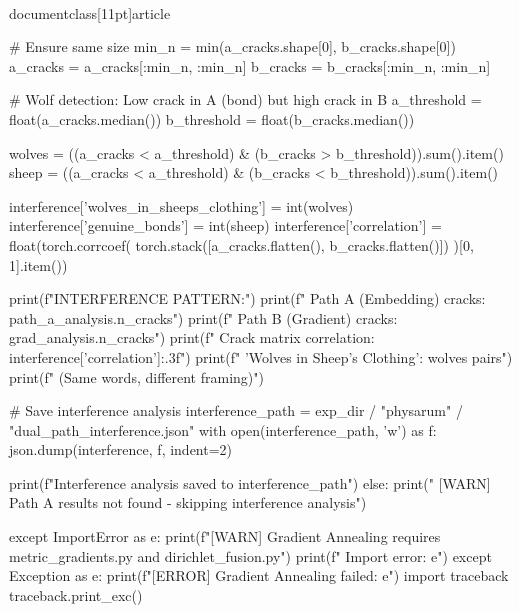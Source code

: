 \\documentclass[11pt]{article}
\begin{document}
\begin{CodeBlock}
                        # Ensure same size
                        min_n = min(a_cracks.shape[0], b_cracks.shape[0])
                        a_cracks = a_cracks[:min_n, :min_n]
                        b_cracks = b_cracks[:min_n, :min_n]
                        
                        # Wolf detection: Low crack in A (bond) but high crack in B
                        a_threshold = float(a_cracks.median())
                        b_threshold = float(b_cracks.median())
                        
                        wolves = ((a_cracks < a_threshold) & (b_cracks > b_threshold)).sum().item()
                        sheep = ((a_cracks < a_threshold) & (b_cracks < b_threshold)).sum().item()
                        
                        interference['wolves_in_sheeps_clothing'] = int(wolves)
                        interference['genuine_bonds'] = int(sheep)
                        interference['correlation'] = float(torch.corrcoef(
                            torch.stack([a_cracks.flatten(), b_cracks.flatten()])
                        )[0, 1].item())
                        
                        print(f"\n  INTERFERENCE PATTERN:")
                        print(f"    Path A (Embedding) cracks: {path_a_analysis.n_cracks}")
                        print(f"    Path B (Gradient) cracks: {grad_analysis.n_cracks}")
                        print(f"    Crack matrix correlation: {interference['correlation']:.3f}")
                        print(f"    'Wolves in Sheep's Clothing': {wolves} pairs")
                        print(f"    (Same words, different framing)")
                    
                    # Save interference analysis
                    interference_path = exp_dir / "physarum" / "dual_path_interference.json"
                    with open(interference_path, 'w') as f:
                        json.dump(interference, f, indent=2)
                    
                    print(f"\n  Interference analysis saved to {interference_path}")
                else:
                    print("  [WARN] Path A results not found - skipping interference analysis")
        
        except ImportError as e:
            print(f"[WARN] Gradient Annealing requires metric_gradients.py and dirichlet_fusion.py")
            print(f"  Import error: {e}")
        except Exception as e:
            print(f"[ERROR] Gradient Annealing failed: {e}")
            import traceback
            traceback.print_exc()


\end{CodeBlock}
\end{document}
